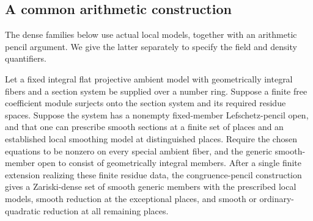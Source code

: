 \subsection{A common arithmetic construction}

The dense families below use actual local models, together with an
arithmetic pencil argument. We give the latter separately to specify
the field and density quantifiers.

\begin{lemma}\label{lem:congruence-pencils}
Let a fixed integral flat projective ambient model with geometrically
integral fibers and a section system be supplied over a number
ring. Suppose a finite free coefficient module surjects
onto the section system and its required residue spaces. Suppose
the system has a nonempty fixed-member Lefschetz-pencil open, and
that one can prescribe smooth sections at a finite set of places
and an established local smoothing model at distinguished places.
Require the chosen equations to be nonzero on every special
ambient fiber, and the generic smooth-member open to consist of
geometrically integral members.
After a single finite extension realizing these finite residue data,
the congruence-pencil construction gives a Zariski-dense set of
smooth generic members with the prescribed local models, smooth
reduction at the exceptional places, and smooth or ordinary-quadratic
reduction at all remaining places.
\end{lemma}


